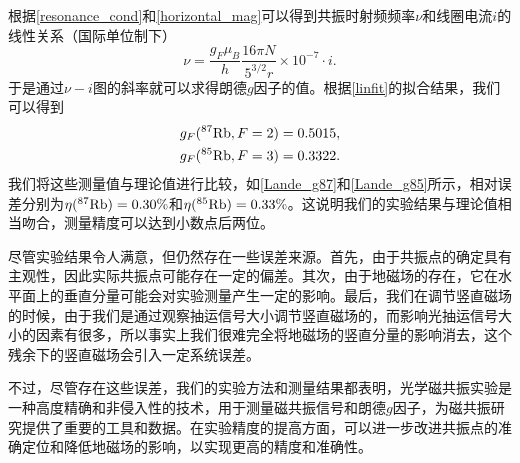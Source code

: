 \documentclass[font=default]{mpltx}
\begin{document}
根据\autoref{resonance_cond}和\autoref{horizontal_mag}可以得到共振时射频频率$\nu$和线圈电流$i$的线性关系（国际单位制下）
\begin{equation}
  \nu=\frac{g_F\mu_B}{h}\frac{16\pi N}{5^{3/2}r}\times 10^{-7}\cdot i.
\end{equation}
于是通过$\nu-i$图的斜率就可以求得朗德$g$因子的值。根据\autoref{linfit}的拟合结果，我们可以得到
\begin{equation}
  \begin{aligned}
    g_F(^{87}{\rm Rb},F=2)=0.5015,\\
    g_F(^{85}{\rm Rb},F=3)=0.3322.
  \end{aligned}
\end{equation}
我们将这些测量值与理论值进行比较，如\autoref{Lande_g87}和\autoref{Lande_g85}所示，相对误差分别为$\eta(^{87}{\rm Rb})=0.30\%$和$\eta(^{85}{\rm Rb})=0.33\%$。这说明我们的实验结果与理论值相当吻合，测量精度可以达到小数点后两位。

尽管实验结果令人满意，但仍然存在一些误差来源。首先，由于共振点的确定具有主观性，因此实际共振点可能存在一定的偏差。其次，由于地磁场的存在，它在水平面上的垂直分量可能会对实验测量产生一定的影响。最后，我们在调节竖直磁场的时候，由于我们是通过观察抽运信号大小调节竖直磁场的，而影响光抽运信号大小的因素有很多，所以事实上我们很难完全将地磁场的竖直分量的影响消去，这个残余下的竖直磁场会引入一定系统误差。

不过，尽管存在这些误差，我们的实验方法和测量结果都表明，光学磁共振实验是一种高度精确和非侵入性的技术，用于测量磁共振信号和朗德$g$因子，为磁共振研究提供了重要的工具和数据。在实验精度的提高方面，可以进一步改进共振点的准确定位和降低地磁场的影响，以实现更高的精度和准确性。
\end{document}
